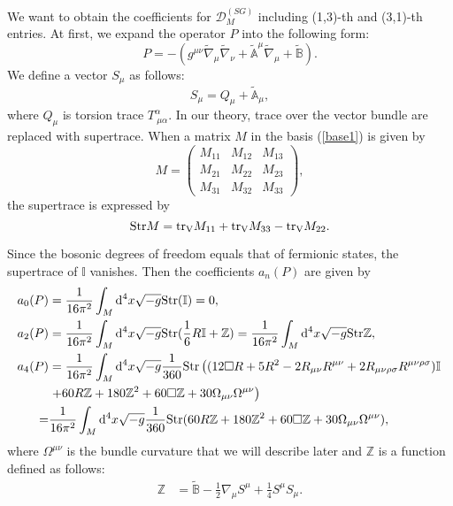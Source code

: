 \documentclass{ptephy}%
\begin{document}
We want to obtain the coefficients for $\mathcal{D}^{(SG)}_M$ including (1,3)-th and (3,1)-th entries. 
At first, we expand the operator $P$ into the following form:
\begin{equation}
P = -(g^{\mu\nu}\tilde{\nabla}_\mu\tilde{\nabla}_\nu +\tilde{\mathbb{A}}^\mu\tilde{\nabla}_\mu +\tilde{\mathbb{B}}). \label{P} 
\end{equation}  
We define a vector $S_\mu$ as follows:
\begin{equation}
S_\mu = Q_\mu+\tilde{\mathbb{A}}_\mu, \label{Smu}
\end{equation}
where $Q_\mu$ is torsion trace $T^\alpha_{\ \mu\alpha}$. 
In our theory, trace over the vector bundle 
are replaced with supertrace. 
When a matrix $M$ in the basis (\ref{base1}) is given by
\begin{equation}
M=\begin{pmatrix}
M_{11} &  M_{12} & M_{13}\\
M_{21} & M_{22} & M_{23}\\
M_{31} & M_{32} & M_{33}
\end{pmatrix},
\end{equation}
the supertrace is expressed by
\begin{equation}
{\rm Str} M = {\rm tr_V} M_{11} +{\rm tr_V}M_{33}-{\rm tr_V} M_{22}. 
\end{equation} 

Since the bosonic degrees of freedom equals that of fermionic states, the supertrace of $\mathbb{I}$ vanishes. 
Then the coefficients $a_n(P)$ are given by
\begin{align} 
a_0(P) & =\frac{1}{16\pi^2}\int_M
{\rm d}^4x\sqrt{-g}
 {\rm Str}(\mathbb{I})=0, \label{a0} \\
a_2(P) & =\frac{1}{16\pi^2}\int_M {\rm d}^4x \sqrt{-g}
{\rm Str}(\frac{1}{6}R\mathbb{I}+\mathbb{Z})
=\frac{1}{16\pi^2}\int_M {\rm d}^4x \sqrt{-g}{\rm Str} \mathbb{Z}, \label{a2} \\
a_4(P) & =\frac{1}{16\pi^2}\int_M {\rm d}^4x \sqrt{-g}
\frac{1}{360}{\rm Str}\left((
12\Box R+5R^2-2R_{\mu\nu}R^{\mu\nu}+2R_{\mu\nu\rho\sigma}R^{\mu\nu\rho\sigma})\mathbb{I}
\right. \nonumber \\
& \left. +60R\mathbb{Z}+180\mathbb{Z}^2+60\Box\mathbb{Z}+30\Omega_{\mu\nu}\Omega^{\mu\nu}
\right) \nonumber \\
= & \frac{1}{16\pi^2}
\int_M {\rm d}^4x\sqrt{-g}
\frac{1}{360}{\rm Str}(60R\mathbb{Z}+180\mathbb{Z}^2+60\Box\mathbb{Z}+30\Omega_{\mu\nu}\Omega^{\mu\nu}),
\label{a4}
\end{align}
where $\Omega^{\mu\nu}$ is the bundle curvature that we will describe later 
and $\mathbb{Z}$ is a function defined as follows:
\begin{align}
\mathbb{Z} & = \tilde{\mathbb{B}} -\frac{1}{2}\nabla_\mu S^\mu +\frac{1}{4}S^\mu S_\mu. 
\end{align}
\end{document}
